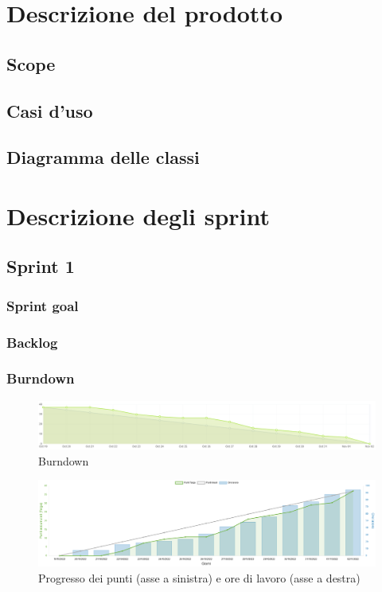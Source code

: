 \documentclass[11pt]{article}
\begin{document}
\tableofcontents
\newpage


\section{Descrizione del prodotto}

\subsection{Scope}

\subsection{Casi d'uso}

\subsection{Diagramma delle classi}


\newpage
\section{Descrizione degli sprint}

\subsection{Sprint 1}
\subsubsection{Sprint goal}

\subsubsection{Backlog}

\subsubsection{Burndown}
\begin{figure}[H]
    \centering
    \includegraphics[width=12cm]{./img/sprint1/burndown.png}
    \caption{Burndown}
\end{figure}
\begin{figure}[H]
    \centering
    \includegraphics[width=12cm]{./img/sprint1/worktime.png}
    \caption{Progresso dei punti (asse a sinistra) e ore di lavoro (asse a destra)}
\end{figure}
\end{document}
